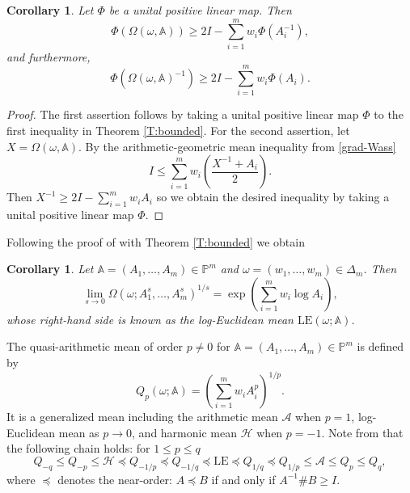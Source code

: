 \documentclass[12pt,reqno]{amsart}
\newtheorem{corollary}[theorem]{Corollary}
\begin{document}
\begin{corollary}
Let $\Phi$ be a unital positive linear map. Then
\begin{displaymath}
\Phi(\Omega (\omega, \mathbb{A})) \geq 2I - \sum_{i=1}^{m} w_{i} \Phi(A_{i}^{-1}),
\end{displaymath}
and furthermore,
\begin{displaymath}
\Phi(\Omega (\omega, \mathbb{A})^{-1}) \geq 2I - \sum_{i=1}^{m} w_{i} \Phi(A_{i}).
\end{displaymath}
\end{corollary}

\begin{proof}
The first assertion follows by taking a unital positive linear map $\Phi$ to the first inequality in Theorem \ref{T:bounded}.
For the second assertion, let $X = \Omega (\omega, \mathbb{A})$. By the arithmetic-geometric mean inequality from \eqref{grad-Wass}
\begin{displaymath}
I \leq \sum_{i=1}^{m} w_{i} \left( \frac{X^{-1} + A_{i}}{2} \right).
\end{displaymath}
Then $\displaystyle X^{-1} \geq 2I - \sum_{i=1}^{m} w_{i} A_{i}$ so we obtain the desired inequality by taking a unital positive linear map $\Phi$.
\end{proof}


Following the proof of \cite[Theorem 4.3]{HK19} with Theorem \ref{T:bounded} we obtain
\begin{corollary}
Let $\mathbb{A} = (A_1, \ldots, A_m) \in \mathbb{P}^m$ and $\omega = (w_{1}, \dots, w_{m}) \in \Delta_{m}$. Then
\begin{displaymath}
\lim_{s \to 0} \Omega(\omega; A_{1}^{s}, \dots, A_{m}^{s})^{1/s} = \exp \left( \sum_{i=1}^{m} w_{i} \log A_{i} \right),
\end{displaymath}
whose right-hand side is known as the log-Euclidean mean $\mathrm{LE}(\omega; \mathbb{A})$.
\end{corollary}

The quasi-arithmetic mean of order $p \neq 0$ for $\mathbb{A} = (A_1, \ldots, A_m) \in \mathbb{P}^m$ is defined by
\begin{displaymath}
Q_{p}(\omega; \mathbb{A}) = \left( \sum_{i=1}^{m} w_{i} A_{i}^{p} \right)^{1/p}.
\end{displaymath}
It is a generalized mean including the arithmetic mean $\mathcal{A}$ when $p=1$, log-Euclidean mean as $p \to 0$, and harmonic mean $\mathcal{H}$ when $p=-1$.
Note from \cite{HK25} that the following chain holds: for $1 \leq p \leq q$
\begin{equation} \label{E:chain}
Q_{-q} \leq Q_{-p} \leq \mathcal{H} \preceq Q_{-1/p} \preceq Q_{-1/q} \preceq \mathrm{LE} \preceq Q_{1/q} \preceq Q_{1/p} \leq \mathcal{A} \leq Q_{p} \leq Q_{q},
\end{equation}
where $\preceq$ denotes the near-order: $A \preceq B$ if and only if $A^{-1} \# B \geq I$.
\end{document}
